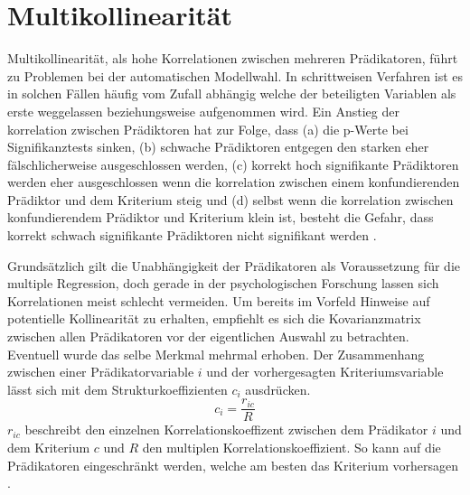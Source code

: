 \section{Multikollinearität}
Multikollinearität, als hohe Korrelationen zwischen mehreren Prädikatoren, führt zu Problemen bei der automatischen Modellwahl. 
In schrittweisen Verfahren ist es in solchen Fällen häufig vom Zufall abhängig welche der beteiligten Variablen als erste weggelassen beziehungsweise aufgenommen wird. 
Ein Anstieg der  korrelation zwischen Prädiktoren hat zur Folge, dass (a) die p-Werte bei Signifikanztests sinken, (b) schwache Prädiktoren entgegen den starken eher fälschlicherweise ausgeschlossen werden, (c) korrekt hoch signifikante Prädiktoren werden eher ausgeschlossen wenn die korrelation zwischen einem konfundierenden Prädiktor und dem Kriterium steig und (d) selbst wenn die korrelation zwischen konfundierendem Prädiktor und Kriterium klein ist, besteht die Gefahr, dass korrekt schwach signifikante Prädiktoren nicht signifikant werden \cite[p. 2810]{graham2003confronting}.

Grundsätzlich gilt die Unabhängigkeit der Prädikatoren als Voraussetzung für die multiple Regression, doch gerade in der psychologischen Forschung lassen sich Korrelationen meist schlecht vermeiden.
Um bereits im Vorfeld Hinweise auf potentielle Kollinearität zu erhalten, empfiehlt es sich die Kovarianzmatrix zwischen allen Prädikatoren vor der eigentlichen Auswahl zu betrachten.
Eventuell wurde das selbe Merkmal mehrmal erhoben.
Der Zusammenhang zwischen einer Prädikatorvariable $i$ und der vorhergesagten Kriteriumsvariable lässt sich mit dem Strukturkoeffizienten $c_i$ ausdrücken.
\begin{equation}
c_i = \frac{r_{ic}}{R}
\tag{Strukturkoeffizient}
\end{equation}
$r_{ic}$ beschreibt den einzelnen Korrelationskoeffizent zwischen dem Prädikator $i$ und dem Kriterium $c$ und $R$ den multiplen Korrelationskoeffizient. 
So kann auf die Prädikatoren eingeschränkt werden,  welche am besten das Kriterium vorhersagen \cite[S. 453]{bortz2011}. 

